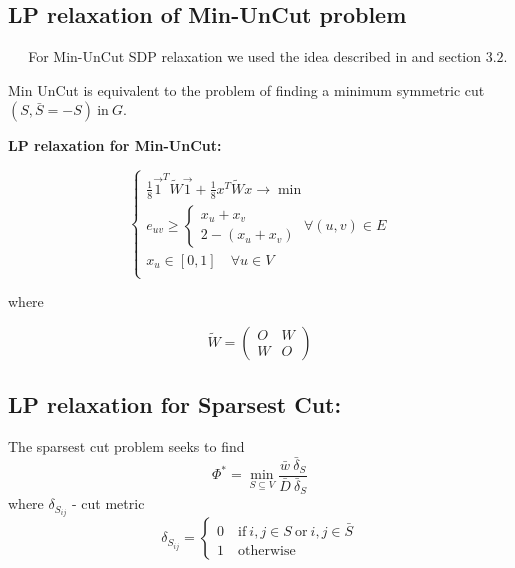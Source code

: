 \documentclass[12pt]{article}
\begin{document}
\subsection{LP relaxation of Min-UnCut problem}

$\quad \ \ $For Min-UnCut SDP relaxation we used the idea described in \cite{Arora} and 
section $3.2$.

Min UnCut is equivalent to the problem
of finding a minimum symmetric cut $(S, \bar{S} = -S) \ \text{in} \ G$.

\textbf{LP relaxation for Min-UnCut:}

\begin{equation}
\begin{cases}
\frac18 \vec 1^T \tilde W \vec 1 + \frac18 x^T \tilde W x \longrightarrow \min \\
e_{uv} \ge \begin{cases}
x_u + x_v \\
2 - (x_u + x_v)
\end{cases}
\; \forall (u,v) \in E\\

x_u \in [0,1] \quad \forall u \in V\\

\end{cases}
\end{equation}

where

\[
\tilde W = \begin{pmatrix} O & W \\ W & O\end{pmatrix}
\]

\subsection{LP relaxation for Sparsest Cut:}

The sparsest cut problem seeks to find
\begin{equation}
\Phi^*= \min\limits_{S \subseteq V} \frac{\bar{w} \ \bar{\delta}_S} {\bar{D} \ 
	\bar{\delta}_S} 
\end{equation}
where $\delta_{S_{ij}}$ - cut metric
\begin{equation}
\delta_{S_{ij}} = 
\begin{cases}
0 \quad \text{if} \ i, j \in S \ \text{or} \ i,j \in \bar{S}\\
1 \quad \text{otherwise}
\end{cases}
\end{equation}
\end{document}
